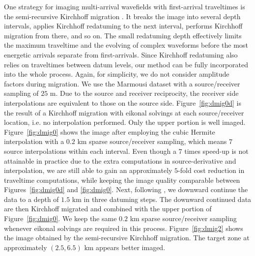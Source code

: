 One strategy for imaging multi-arrival wavefields with first-arrival traveltimes is the semi-recursive 
Kirchhoff migration \cite[]{bevc}. It breaks the image into several depth intervals, applies Kirchhoff 
redatuming to the next interval, performs Kirchhoff migration from there, and so on. The small redatuming 
depth effectively limits the maximum traveltime and the evolving of complex waveforms before the most 
energetic arrivals separate from first-arrivals. Since Kirchhoff redatuming also relies on traveltimes 
between datum levels, our method can be fully incorporated into the whole process. Again, for simplicity, 
we do not consider amplitude factors during migration. We use the Marmousi dataset with a source/receiver 
sampling of $25$ m. Due to the source and receiver reciprocity, the receiver side interpolations are 
equivalent to those on the source side. Figure~\ref{fig:dmig0d} is the result of a Kirchhoff migration 
with eikonal solvings at each source/receiver location, i.e. no interpolation performed. Only the upper 
portion is well imaged. Figure~\ref{fig:dmig0} shows the image after employing the cubic Hermite 
interpolation with a $0.2$ km sparse source/receiver sampling, which means $7$ source interpolations 
within each interval. Even though a $7$ times speed-up is not attainable in practice due to the extra 
computations in source-derivative and interpolation, we are still able to gain an approximately $5$-fold 
cost reduction in traveltime computations, while keeping the image quality comparable between 
Figures~\ref{fig:dmig0d} and \ref{fig:dmig0}. Next, following \cite{bevc}, we downward continue the data 
to a depth of $1.5$ km in three datuming steps. The downward continued data are then Kirchhoff migrated 
and combined with the upper portion of Figure~\ref{fig:dmig0}. We keep the same $0.2$ km sparse 
source/receiver sampling whenever eikonal solvings are required in this process. Figure~\ref{fig:dmig2} 
shows the image obtained by the semi-recursive Kirchhoff migration. The target zone at approximately 
$(2.5,6.5)$ km appears better imaged.



